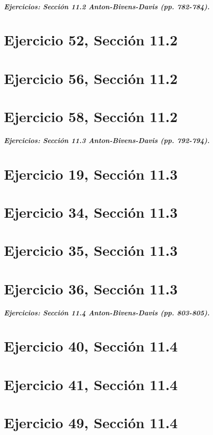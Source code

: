 \documentclass[11pt,letterpaper]{article}
\begin{document}

\subparagraph{Ejercicios: Sección 11.2 Anton-Bivens-Davis (pp. 782-784).}

\section{Ejercicio 52, Sección 11.2}

\section{Ejercicio 56, Sección 11.2}

\section{Ejercicio 58, Sección 11.2}


\subparagraph{Ejercicios: Sección 11.3 Anton-Bivens-Davis (pp. 792-794).}

\section{Ejercicio 19, Sección 11.3}

\section{Ejercicio 34, Sección 11.3}

\section{Ejercicio 35, Sección 11.3}

\section{Ejercicio 36, Sección 11.3}



\subparagraph{Ejercicios: Sección 11.4 Anton-Bivens-Davis (pp. 803-805).}

\section{Ejercicio 40, Sección 11.4}

\section{Ejercicio 41, Sección 11.4}

\section{Ejercicio 49, Sección 11.4}
\end{document}
